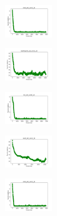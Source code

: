 \begin{figure}[H]
    \hfill
    \begin{subfigure}
        \centering
        \includegraphics[width=0.234\textwidth]{img/am01mej/rand_set_const_10_277451237_cost.png}
    \end{subfigure}
    \hfill
    \begin{subfigure}
        \centering
        \includegraphics[width=0.234\textwidth]{img/am01mej/newthyroid_set_const_10_277451237_cost.png}
    \end{subfigure}
    \hfill
    \begin{subfigure}
        \centering
        \includegraphics[width=0.234\textwidth]{img/am01mej/iris_set_const_10_49258669_cost.png}
    \end{subfigure}
    \hfill
    \begin{subfigure}
        \centering
        \includegraphics[width=0.234\textwidth]{img/am01mej/ecoli_set_const_10_49258669_cost.png}
    \end{subfigure}
    \hfill
    \begin{subfigure}
        \centering
        \includegraphics[width=0.234\textwidth]{img/am01mej/rand_set_const_10_49258669_cost.png}
    \end{subfigure}
    \hfill
    \begin{subfigure}

\end{subfigure}
\end{figure}
